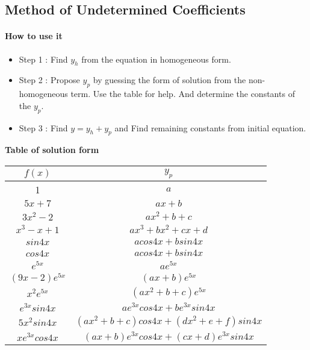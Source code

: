 \subsection{Method of Undetermined Coefficients}
\begin{tcolorbox}[title=Method]
	\paragraph{How to use it}
	\begin{itemize}
		\item Step 1 : Find \(y_h\) from the equation in homogeneous form.
		\item Step 2 : Propose \(y_p\) by guessing the form of solution from the non-homogeneous term. Use the table for help. And determine the constants of the \(y_p\).
		\item Step 3 : Find \(y = y_h + y_p\) and Find remaining constants from initial equation.
	\end{itemize}
	\textbf{Table of solution form}
	\begin{tabular}{|c|c|}
		\hline
		\(f(x)\)         & \(y_p\)                                 \\
		\hline
		1                & \(a\)                                   \\
		\hline
		\(5x+7\)         & \(ax+b\)                                \\
		\hline
		\(3x^2-2\)       & \(ax^2+b+c\)                            \\
		\hline
		\(x^3-x+1\)      & \(ax^3+bx^2+cx+d\)                      \\
		\hline
		\(sin4x\)        & \(acos4x+bsin4x\)                       \\
		\hline
		\(cos4x\)        & \(acos4x+bsin4x\)                       \\
		\hline
		\(e^{5x}\)       & \(ae^{5x}\)                             \\
		\hline
		\((9x-2)e^{5x}\) & \((ax+b)e^{5x}\)                        \\
		\hline
		\(x^2e^{5x}\)    & \((ax^2+b+c)e^{5x}\)                    \\
		\hline
		\(e^{3x}sin4x\)  & \(ae^{3x}cos4x+be^{3x}sin4x\)           \\
		\hline
		\(5x^2sin4x\)    & \((ax^2+b+c)cos4x+(dx^2+e+f)sin4x\)     \\
		\hline
		\(xe^{3x}cos4x\) & \((ax+b)e^{3x}cos4x+(cx+d)e^{3x}sin4x\) \\
		\hline
	\end{tabular}
\end{tcolorbox}



